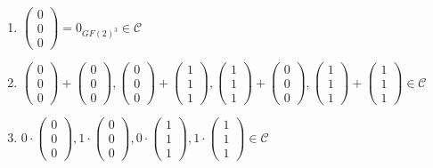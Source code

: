\documentclass{../tudscript}
\begin{document}
\begin{enumerate}
\def\labelenumi{\arabic{enumi}.}
\tightlist
\item
  \(\begin{pmatrix}0\\0\\0\end{pmatrix} = 0_{GF(2)^3} \in \mathscr{C}\)
\item
  \(\begin{pmatrix}0\\0\\0\end{pmatrix} + \begin{pmatrix}0\\0\\0\end{pmatrix},  \begin{pmatrix}0\\0\\0\end{pmatrix} + \begin{pmatrix}1\\1\\1\end{pmatrix},  \begin{pmatrix}1\\1\\1\end{pmatrix} + \begin{pmatrix}0\\0\\0\end{pmatrix},  \begin{pmatrix}1\\1\\1\end{pmatrix} + \begin{pmatrix}1\\1\\1\end{pmatrix}  \in \mathscr{C}\)
\item
  \(0 \cdot \begin{pmatrix}0\\0\\0\end{pmatrix},  1 \cdot \begin{pmatrix}0\\0\\0\end{pmatrix},  0 \cdot \begin{pmatrix}1\\1\\1\end{pmatrix},  1 \cdot \begin{pmatrix}1\\1\\1\end{pmatrix} \in \mathscr{C}\)
\end{enumerate}
\end{document}

